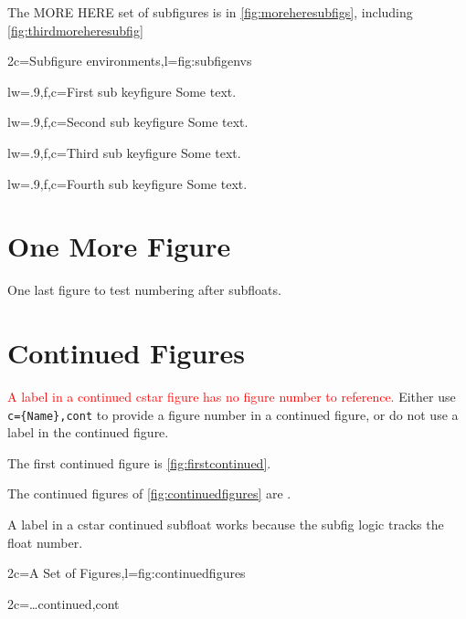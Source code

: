 \documentclass{article}
\begin{document}
The MORE HERE set of subfigures is in \cref{fig:moreheresubfigs},
including \cref{fig:thirdmoreheresubfig}


\begin{keysubfigs}{2}{c=Subfigure environments,l=fig:subfigenvs}
\begin{keyfigure}{lw=.9,f,c={First sub keyfigure}}
Some text.
\end{keyfigure}
\begin{keyfigure}{lw=.9,f,c={Second sub keyfigure}}
Some text.
\end{keyfigure}
\begin{keyfigure}{lw=.9,f,c={Third sub keyfigure}}
Some text.
\end{keyfigure}
\begin{keyfigure}{lw=.9,f,c={Fourth sub keyfigure}}
Some text.
\end{keyfigure}
\end{keysubfigs}

\clearpage

\section{One More Figure}

One last figure to test numbering after subfloats.


\clearpage

\section{Continued Figures}

\textcolor{red}{A label in a continued cstar figure has no figure number
to reference.}  Either use \verb|c={Name},cont| to provide a figure number
in a continued figure, or do not use a label in the continued figure.


The first continued figure is \cref{fig:firstcontinued}.

The continued figures of \cref{fig:continuedfigures}
are .

A label in a cstar continued subfloat works because the subfig
logic tracks the float number.

\begin{keysubfigs}[hbp]{2}{c={A Set of Figures},l=fig:continuedfigures}
\end{keysubfigs}
\begin{keysubfigs}[hbp]{2}{c={\dots continued},cont}
\end{keysubfigs}
\end{document}
